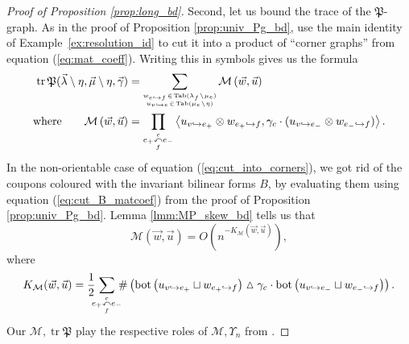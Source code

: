 \documentclass{amsart}
\newcommand{\corner}[1][]{
 \underset{f#1}
 {
  \overset{c#1}{\curvearrowleft}
 }
}
\newcommand{\tn}{\textnormal}
\newcommand{\tr}{\operatorname{tr}}
\begin{document}
\begin{proof}[Proof of Proposition \ref{prop:long_bd}]
Second, let us bound the trace of the $\mathfrak{P}$-graph. As in the proof of Proposition \ref{prop:univ_Pg_bd}, use the main identity of Example~\ref{ex:resolution_id} to cut it into a product of ``corner graphs'' from equation (\ref{eq:mat_coeff}). Writing this in symbols gives us the formula
\begin{align}\begin{split}\label{eq:cut_into_corners}
\tr\mathfrak{P}(\vec\lambda\setminus\eta,\vec\mu\setminus\eta,\vec\gamma)&=\sum_{\tiny\begin{matrix}w_{e\hookrightarrow f}\!\in\!\tn{Tab}(\lambda_f\!\setminus\!\mu_e)\\u_{v\hookrightarrow e}\!\in\!\tn{Tab}(\mu_e\!\setminus\!\eta)\end{matrix}}\mathcal{M}\left(\vec{w},\vec{u}\right)\\
\text{where}\qquad\mathcal{M}\left(\vec{w},\vec{u}\right)&=\prod_{e_+\corner e_-}\left\langle u_{v\hookrightarrow e_+}\otimes w_{e_+\hookrightarrow f},\gamma_c\cdot(u_{v\hookrightarrow e_-}\otimes w_{e_-\hookrightarrow f})\right\rangle.
\end{split}\end{align}
In the non-orientable case of equation (\ref{eq:cut_into_corners}), we got rid of the coupons coloured with the invariant bilinear forms $B$, by evaluating them using equation (\ref{eq:cut_B_matcoef}) from the proof of Proposition \ref{prop:univ_Pg_bd}. Lemma \ref{lmm:MP_skew_bd} tells us that
\begin{equation}\label{eq:M_powerlaw}
\mathcal{M}(\vec{w},\vec{u})=O(n^{-K_\mathcal{M}(\vec{w},\vec{u})}),
\end{equation}
where
\begin{equation}\label{eq:corner_mat_coeff_decay}
K_\mathcal{M}(\vec{w},\vec{u})=\frac{1}{2}\hspace*{-5pt}\sum_{e_+\corner e_-}\hspace*{-5pt}\#\left(\tn{bot}\left(u_{v\hookrightarrow e_+}\sqcup w_{e_+\hookrightarrow f}\right)\vartriangle\gamma_c\cdot\tn{bot}\left(u_{v\hookrightarrow e_-}\sqcup w_{e_-\hookrightarrow f}\right)\right).
\end{equation}
Our $\mathcal{M},\tr\mathfrak{P}$ play the respective roles of $\mathcal{M},\Upsilon_n$ from \cite[Proposition 5.8]{asymptotic_stats_random_covering_surfaces_MageePuder23}.


\end{proof}
\end{document}
